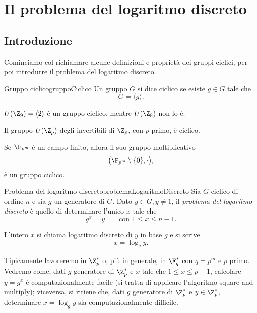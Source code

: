 \chapter{Il problema del logaritmo discreto}
%
%
\section{Introduzione}

	Cominciamo col richiamare alcune definizioni e proprietà dei gruppi ciclici, per poi introdurre il problema del logaritmo discreto.

	\begin{defn}{Gruppo ciclico}{gruppoCiclico}
	Un gruppo \(G\) si dice ciclico se esiste \(g\in G\) tale che
		\[
		G = \langle g \rangle.
		\]
	\end{defn}

	\begin{ese}
	\(U(\Z_9)=\langle 2\rangle\) è un gruppo ciclico, mentre \(U(\Z_8)\) non lo è.
	\end{ese}

	\begin{pr}
	Il gruppo \(U(\Z_p)\) degli invertibili di \(\Z_p\), con \(p\) primo, è ciclico.
	\end{pr}

	\begin{pr}
	Se \(\F_{p^m}\) è un campo finito, allora il suo gruppo moltiplicativo
		\[
		\big(\F_{p^m}\setminus\{0\},\cdot\big),
		\]
	è un gruppo ciclico.
	\end{pr}

	\begin{defn}{Problema del logaritmo discreto}{problemaLogaritmoDiscreto}
	Sia \(G\) ciclico di ordine \(n\) e sia \(g\) un generatore di \(G\).
	Dato \(y\in G,y\neq 1\), il \emph{problema del logaritmo discreto} è quello di determinare l'unico \(x\) tale che
		\[
		g^x = y \qquad\text{con }1\le x \le n-1.
		\]
	\end{defn}

	\begin{notz}
	L'intero \(x\) si chiama logaritmo discreto di \(y\) in base \(g\) e si scrive
		\[
		x = \log_g y.
		\]
	\end{notz}
	\noindent
	Tipicamente lavoreremo in \(\Z_p^*\) o, più in generale, in \(\F_q^*\) con \(q=p^m\) e \(p\) primo.
	Vedremo come, dati \(g\) generatore di \(\Z_p^*\) e \(x\) tale che \(1\le x \le p-1\), calcolare \(y=g^x\) è computazionalmente facile (si tratta di applicare l'algoritmo square and multiply); viceversa, si ritiene che, dati \(g\) generatore di \(\Z_p^*\) e \(y\in\Z_p^*\), determinare \(x=\log_g y\) sia computazionalmente difficile.

